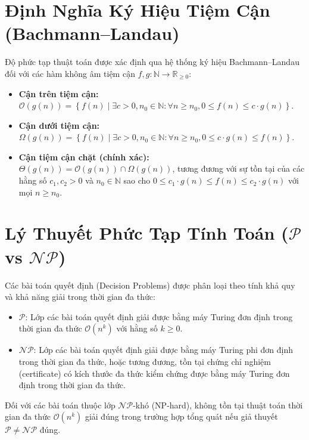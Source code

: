 \documentclass[11pt, letterpaper]{report}
\begin{document}
\section{Định Nghĩa Ký Hiệu Tiệm Cận (Bachmann--Landau)}
Độ phức tạp thuật toán được xác định qua hệ thống ký hiệu Bachmann--Landau \cite{knuth1997art} đối với các hàm không âm tiệm cận $f, g: \mathbb{N} \to \mathbb{R}_{\ge 0}$:
\begin{itemize}
 \item \textbf{Cận trên tiệm cận:} $\mathcal{O}(g(n)) = \left\{ f(n) \mid \exists c > 0, n_0 \in \mathbb{N} : \forall n \ge n_0, 0 \le f(n) \le c \cdot g(n) \right\}$.
 \item \textbf{Cận dưới tiệm cận:} $\Omega(g(n)) = \left\{ f(n) \mid \exists c > 0, n_0 \in \mathbb{N} : \forall n \ge n_0, 0 \le c \cdot g(n) \le f(n) \right\}$.
 \item \textbf{Cận tiệm cận chặt (chính xác):} $\Theta(g(n)) = \mathcal{O}(g(n)) \cap \Omega(g(n))$, tương đương với sự tồn tại của các hằng số $c_1, c_2 > 0$ và $n_0 \in \mathbb{N}$ sao cho $0 \le c_1 \cdot g(n) \le f(n) \le c_2 \cdot g(n)$ với mọi $n \ge n_0$.
\end{itemize}

\section{Lý Thuyết Phức Tạp Tính Toán (\texorpdfstring{$\mathcal{P}$ vs $\mathcal{NP}$}{P vs NP})}
Các bài toán quyết định (Decision Problems) được phân loại theo tính khả quy và khả năng giải trong thời gian đa thức:
\begin{itemize}
 \item $\mathcal{P}$: Lớp các bài toán quyết định giải được bằng máy Turing đơn định trong thời gian đa thức $\mathcal{O}(n^k)$ với hằng số $k \ge 0$.
 \item $\mathcal{NP}$: Lớp các bài toán quyết định giải được bằng máy Turing phi đơn định trong thời gian đa thức, hoặc tương đương, tồn tại chứng chỉ nghiệm (certificate) có kích thước đa thức kiểm chứng được bằng máy Turing đơn định trong thời gian đa thức.
\end{itemize}
Đối với các bài toán thuộc lớp $\mathcal{NP}$-khó (NP-hard), không tồn tại thuật toán thời gian đa thức $\mathcal{O}(n^k)$ giải đúng trong trường hợp tổng quát nếu giả thuyết $\mathcal{P} \neq \mathcal{NP}$ đúng.

\end{document}
